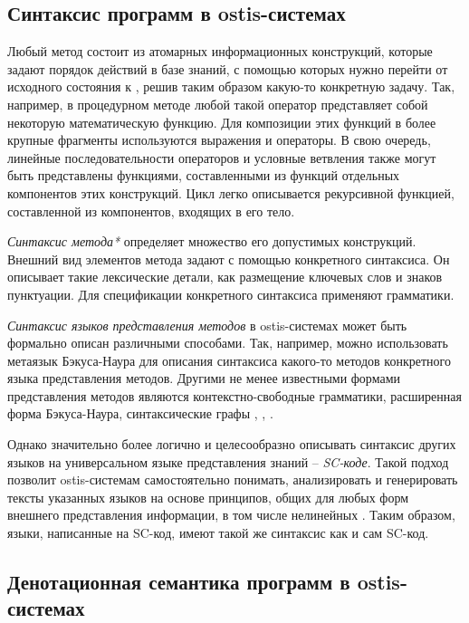 \subsection{Синтаксис программ в ostis-системах}
\label{sec_programs_method_syntax}

Любый метод состоит из атомарных информационных конструкций, которые задают порядок действий в базе знаний, с помощью которых нужно перейти от исходного состояния к , решив таким образом какую-то конкретную задачу. Так, например, в процедурном методе любой такой оператор представляет собой некоторую математическую функцию. Для композиции этих функций в более крупные фрагменты используются выражения и операторы. В свою очередь, линейные последовательности операторов и условные ветвления также могут быть представлены функциями, составленными из функций отдельных компонентов этих конструкций. Цикл легко описывается рекурсивной функцией, составленной из компонентов, входящих в его тело.

\textit{Синтаксис метода*} определяет множество его допустимых конструкций. Внешний вид элементов метода задают с помощью конкретного синтаксиса. Он описывает такие лексические детали, как размещение ключевых слов и знаков пунктуации. Для спецификации конкретного синтаксиса применяют грамматики.

\textit{Синтаксис языков представления методов} в ostis-системах может быть формально описан различными способами. Так, например, можно использовать метаязык Бэкуса-Наура для описания синтаксиса какого-то методов конкретного языка представления методов. Другими не менее известными формами представления методов являются контекстно-свободные грамматики, расширенная форма Бэкуса-Наура, синтаксические графы \cite{Sebesta2012}, \cite{Scott2006}, \cite{Scott1972}.

Однако значительно более логично и целесообразно описывать синтаксис других языков на универсальном языке представления знаний -- \textit{SC-коде}. Такой подход позволит ostis-системам самостоятельно понимать, анализировать и генерировать тексты указанных языков на основе принципов, общих для любых форм внешнего представления информации, в том числе нелинейных \cite{Petrov1978}. Таким образом, языки, написанные на SC-код, имеют такой же синтаксис как и сам SC-код.

\subsection{Денотационная семантика программ в ostis-системах}
\label{sec_programs_method_den_semantic}

